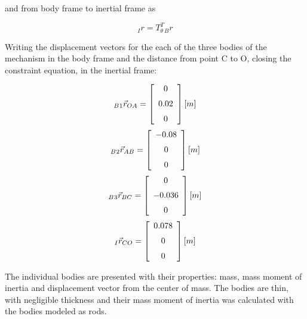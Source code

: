 and from body frame to inertial frame as

\begin{equation}\label{b_to_I}
_{I}{r} = T_{\theta}^T {_B }{r}
\end{equation}


Writing the displacement vectors for the each of the three bodies of the mechanism in the body frame and the distance from point C to O, closing the constraint equation, in the inertial frame:


\begin{equation} \label{disp_vec1}
 _B{_1}\vec{r}_{OA} = \left[ \begin {array}{c} 0\\ \noalign{\medskip} 0.02
\\ \noalign{\medskip}0\end {array} \right ]   [m]
\end{equation}
\begin{equation}\label{disp_vec2}
 _B{_2}\vec{r}_{AB} = \left[ \begin {array}{c} - 0.08\\ \noalign{\medskip}0
\\ \noalign{\medskip}0\end {array} \right] [m]
\end{equation}
\begin{equation}\label{disp_vec3}
_B{_3}\vec{r}_{BC} =  \left[ \begin {array}{c} 0\\ \noalign{\medskip}- 0.036
\\ \noalign{\medskip}0\end {array} \right]  [m]
\end{equation}
\begin{equation}\label{disp_vec4}
_I\vec{r}_{CO} =  \left[ \begin {array}{c}  0.078\\ \noalign{\medskip}0
\\ \noalign{\medskip}0\end {array} \right] [m]
\end{equation}

The individual bodies are presented with their properties: mass, mass moment of inertia and displacement vector from the center of mass. The bodies are thin, with negligible thickness and their mass moment of inertia was calculated with the bodies modeled as rods.

